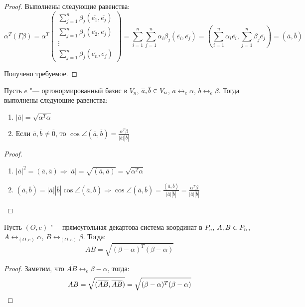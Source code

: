     \begin{proof}
    	Выполнены следующие равенства:
    	\[\alpha^T(\Gamma\beta) = \alpha^T\begin{pmatrix}
    	\sum_{j = 1}^{n}\beta_j(\overline{e_1}, \overline{e_j}) \\
    	\sum_{j = 1}^{n}\beta_j(\overline{e_2}, \overline{e_j}) \\
    	\vdots\\
    	\sum_{j = 1}^{n}\beta_j(\overline{e_n}, \overline{e_j})
    	\end{pmatrix} =  \sum_{i = 1}^{n}\sum_{j = 1}^{n}\alpha_i\beta_j(\overline{e_i}, \overline{e_j}) = \left(\sum_{i = 1}^{n}\alpha_i\overline{e_i}, \sum_{j = 1}^{n}\beta_j\overline{e_j}\right) = (\overline{a}, \overline{b})\]
    
    	Получено требуемое.
    \end{proof}
    
    \begin{proposition}
    	Пусть $e$ "--- ортонормированный базис в $V_n$, $\overline{a}, \overline{b} \hm{\in} V_n$, $\overline{a} \leftrightarrow_{e} \alpha$, $\overline{b} \leftrightarrow_{e} \beta$. Тогда выполнены следующие равенства:
    	\begin{enumerate}
    		\item $|\overline{a}| = \sqrt{\alpha^T\alpha}$
    		\item Если $\overline{a}, \overline{b} \ne \overline{0}$, то $\cos\angle(\overline{a}, \overline{b}) = \frac{\alpha^T\beta}{|\overline{a}||\overline{b}|}$
    	\end{enumerate}
    \end{proposition}
    
    \begin{proof}~
    	\begin{enumerate}
    		\item $|\overline{a}|^2 = (\overline{a}, \overline{a}) \Rightarrow |\overline{a}| = \sqrt{(\overline{a},\overline{a})} = \sqrt{\alpha^T\alpha}$
    		\item $(\overline{a}, \overline{b}) = |\overline{a}||\overline{b}|\cos\angle(\overline{a}, \overline{b}) \Rightarrow \cos\angle(\overline{a}, \overline{b}) = \frac{(\overline{a}, \overline{b})}{|\overline{a}||\overline{b}|} = \frac{\alpha^T\beta}{|\overline{a}||\overline{b}|}$\qedhere
    	\end{enumerate}
    \end{proof}
    
    \begin{proposition}
    	Пусть $(O, e)$ "--- прямоугольная декартова система координат в $P_n$, $A, B \hm{\in} P_n$, $A \leftrightarrow_{(O, e)} \alpha$, $B \leftrightarrow_{(O, e)} \beta$. Тогда:
    	\[AB = \sqrt{(\beta - \alpha)^T(\beta - \alpha)}\]
    \end{proposition}
    
    \begin{proof}
    	Заметим, что $\overline{AB} \leftrightarrow_{e} \beta - \alpha$, тогда:
    	\[AB = \sqrt{(\overline{AB}, \overline{AB})} = \sqrt{(\beta - \alpha)^T(\beta - \alpha)}\qedhere\]
    \end{proof}
    